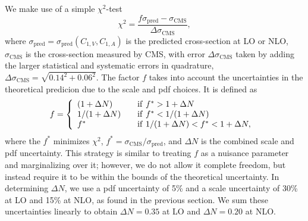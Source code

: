 \documentclass[preprint]{JHEP3} %
\begin{document}
We make use of a simple $\chi^2$-test 
\begin{equation}
\chi^2 = \frac{f \sigma_{\mathrm{pred}} - \sigma_{\mathrm{CMS}}}{\Delta \sigma_{\mathrm{CMS}}},
\end{equation}
where $\sigma_{\mathrm{pred}}=\sigma_{\mathrm{pred}}(C_{1,V},C_{1,A})$ is the predicted cross-section at LO or NLO, $\sigma_{\mathrm{CMS}}$ is the cross-section measured by CMS, with error $\Delta \sigma_{\mathrm{CMS}}$ taken by adding the larger statistical and systematic errors in quadrature, $\Delta \sigma_{\mathrm{CMS}}=\sqrt{0.14^2+0.06^2}$. The factor $f$ takes into account the uncertainties in the theoretical predicion due to the scale and pdf choices. It is defined as \cite{Baur:2004uw,Baur:2005wi}
 \begin{equation}
f = \left\{ 
\begin{array} {l l}
(1+\Delta N)  & \quad \mathrm{if}~ f^* > 1 + \Delta N \\
1/(1+\Delta N)  & \quad \mathrm{if}~ f^* < 1/(1 + \Delta N) \\
f^* & \quad \mathrm{if}~ 1/(1 + \Delta N) < f^* < 1+\Delta N,
\end{array} \right.\ 
\end{equation}  
where the $f^*$ minimizes $\chi^2$, $f^* = \sigma_{\mathrm{CMS}} / \sigma_{\mathrm{pred}}$, and $\Delta N$ is the combined scale and pdf uncertainty. This strategy is similar to treating $f$ as a nuisance parameter and marginalizing over it; however, we do not allow it complete freedom, but instead require it to be within the bounds of the theoretical uncertainty. In determining $\Delta N$, we use a pdf uncertainty of 5\% and a scale uncertainty of 30\% at LO and 15\% at NLO, as found in the previous section. We sum these uncertainties linearly to obtain $\Delta N = 0.35$ at LO and $\Delta N = 0.20$ at NLO. 
\end{document}
